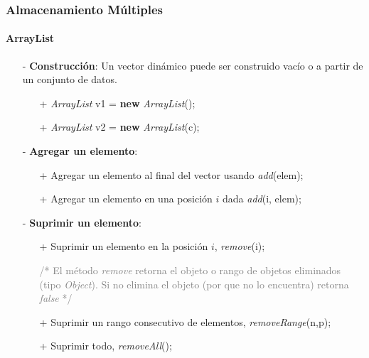 \documentclass{beamer}
\begin{document}
        \begin{frame}
			\frametitle{Almacenamiento M\'ultiples}
			\framesubtitle{ArrayList}

			\begin{block}{}
			    {\scriptsize
			        \begin{itemize} 
				        \item[-] \textbf{Construcci\'on}: Un vector din\'amico puede ser construido vac\'io o a partir de un conjunto de datos. 
				        \begin{itemize} 
				            \item[+] {\scriptsize \emph{ArrayList} v1 = \textbf{new} \emph{ArrayList}();}
				            \item[+] {\scriptsize \emph{ArrayList} v2 = \textbf{new} \emph{ArrayList}(c);}
				        \end{itemize}
				        \item[-] \textbf{Agregar un elemento}: 
				        \begin{itemize}
				            \item[+] {\scriptsize Agregar un elemento al final del vector usando \emph{add}(elem);}
				            \item[+] {\scriptsize Agregar un elemento en una posici\'on $i$ dada \emph{add}(i, elem);}
				        \end{itemize}
				        \item[-] \textbf{Suprimir un elemento}: 
				        \begin{itemize} 
				            \item[+] {\scriptsize Suprimir un elemento en la posici\'on $i$, \emph{remove}(i);}
				            \item[ ] {\scriptsize \textcolor{gray}{/* El m\'etodo \emph{remove} retorna el objeto o rango de objetos eliminados (tipo \emph{Object}). Si no elimina el objeto (por que no lo encuentra) retorna \emph{false} */}}
				            \item[+] {\scriptsize Suprimir un rango consecutivo de elementos, \emph{removeRange}(n,p);}
				            \item[+] {\scriptsize Suprimir todo, \emph{removeAll}();}
				        \end{itemize}
				    \end{itemize}
			    }
			\end{block}
		\end{frame}
\end{document}
